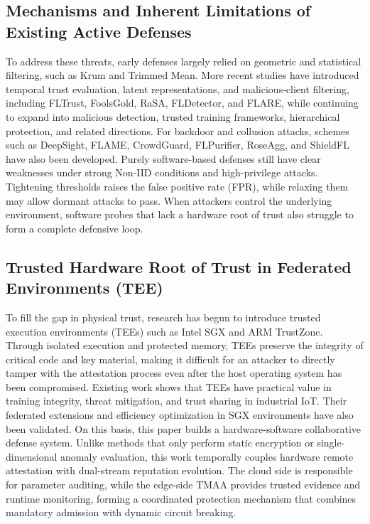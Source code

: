 \documentclass[final,5p,times,twocolumn]{elsarticle/elsarticle}
\begin{document}
\subsection{Mechanisms and Inherent Limitations of Existing Active Defenses}
To address these threats, early defenses largely relied on geometric and statistical filtering, such as Krum\cite{blanchard2017krum} and Trimmed Mean\cite{yin2018byzantine}. More recent studies have introduced temporal trust evaluation, latent representations, and malicious-client filtering, including FLTrust\cite{cao2021fltrust}, FoolsGold\cite{fung2020foolsgold}, RaSA\cite{wang2025rasa}, FLDetector\cite{fldetector2022}, and FLARE\cite{flare2022}, while continuing to expand into malicious detection\cite{dou2025toward}, trusted training frameworks\cite{lu2025tmt}, hierarchical protection\cite{wang2024federated}, and related directions. For backdoor and collusion attacks, schemes such as DeepSight\cite{deepsight2022}, FLAME\cite{flame2022}, CrowdGuard\cite{crowdguard2024}, FLPurifier\cite{flpurifier}, RoseAgg\cite{roseagg}, and ShieldFL\cite{shieldfl} have also been developed.
Purely software-based defenses still have clear weaknesses under strong Non-IID conditions and high-privilege attacks. Tightening thresholds raises the false positive rate (FPR), while relaxing them may allow dormant attacks to pass. When attackers control the underlying environment, software probes that lack a hardware root of trust also struggle to form a complete defensive loop.

\subsection{Trusted Hardware Root of Trust in Federated Environments (TEE)}
To fill the gap in physical trust, research has begun to introduce trusted execution environments (TEEs) such as Intel SGX and ARM TrustZone. Through isolated execution and protected memory, TEEs preserve the integrity of critical code and key material, making it difficult for an attacker to directly tamper with the attestation process even after the host operating system has been compromised\cite{zhang2025rppfl,liao2024verifiable}. Existing work shows that TEEs have practical value in training integrity\cite{r1_tee_integrity}, threat mitigation\cite{r5_tee_mitigating}, and trust sharing in industrial IoT\cite{r12_iot_tee}. Their federated extensions and efficiency optimization in SGX environments have also been validated\cite{xu2021distributed,yan2024efficient}.
On this basis, this paper builds a hardware-software collaborative defense system. Unlike methods that only perform static encryption or single-dimensional anomaly evaluation, this work temporally couples hardware remote attestation with dual-stream reputation evolution. The cloud side is responsible for parameter auditing, while the edge-side TMAA provides trusted evidence and runtime monitoring, forming a coordinated protection mechanism that combines mandatory admission with dynamic circuit breaking.
\end{document}
